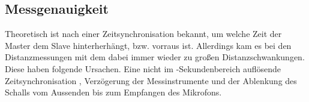 \subsection{Messgenauigkeit}
Theoretisch ist nach einer Zeitsynchronisation bekannt, um welche Zeit der Master dem Slave hinterherhängt, bzw. vorraus ist. Allerdings kam es bei den Distanzmessungen mit dem \board \platz dabei immer wieder zu großen Distanzschwankungen. Diese haben folgende Ursachen. Eine nicht im \si{\mu}-Sekundenbereich auflösende Zeitsynchronisation , Verzögerung der Messinstrumente und der Ablenkung des Schalls vom Aussenden bis zum Empfangen des Mikrofons.

